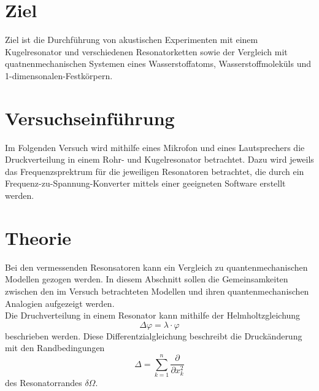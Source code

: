 \section{Ziel}
Ziel ist die Durchführung von akustischen Experimenten mit einem Kugelresonator und verschiedenen Resonatorketten
sowie der Vergleich mit quatnenmechanischen Systemen eines Wasserstoffatoms, Wasserstoffmoleküls und 1-dimensonalen-Festkörpern.

\section{Versuchseinführung}
Im Folgenden Versuch wird mithilfe eines Mikrofon und eines Lautsprechers die Druckverteilung in einem Rohr- und Kugelresonator 
betrachtet. Dazu wird jeweils das Frequenzsprektrum für die jeweiligen Resonatoren betrachtet, die durch ein Frequenz-zu-Spannung-Konverter
mittels einer geeigneten Software erstellt werden. 

\section{Theorie}
Bei den vermessenden Resonsatoren kann ein Vergleich zu quantenmechanischen Modellen gezogen werden. In diesem 
Abschnitt sollen die Gemeinsamkeiten zwischen den im Versuch betrachteten Modellen und ihren
quantenmechanischen Analogien aufgezeigt werden.\\


Die Druchverteilung in einem Resonator kann mithilfe der Helmholtzgleichung
\begin{equation}
    \Delta \varphi=\lambda \cdot \varphi
    \label{eq:helmholtz_all}
\end{equation}
beschrieben werden. Diese Differentzialgleichung beschreibt die Druckänderung mit den Randbedingungen
\begin{equation}
    \Delta=\sum_{k=1}^n \frac{\partial}{\partial x_k^2}
\end{equation}
des Resonatorrandes $\delta \Omega$.




